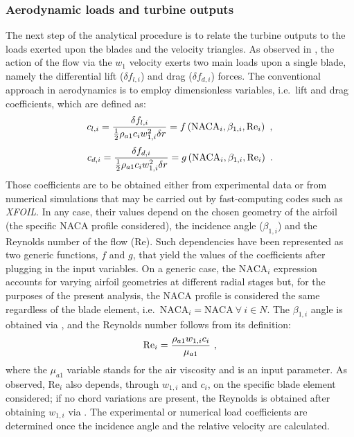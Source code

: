 \subsubsection*{Aerodynamic loads and turbine outputs}{\label{subsubsec:aerodynamic_loads_turbine_outputs}}
The next step of the analytical procedure is to relate the turbine outputs to the loads exerted upon the blades and the velocity triangles. As observed in , the action of the flow via the $w_{1}$ velocity exerts two main loads upon a single blade, namely the differential lift ($\delta{f_{l,i}}$) and drag ($\delta{f_{d,i}}$) forces. The conventional approach in aerodynamics is to employ dimensionless variables, i.e.\ lift and drag coefficients, which are defined as:
\begin{equation}{\label{eq:cl_definition}}
	c_{l,i} = \frac{\delta{f_{l,i}}}{\frac{1}{2}\rho_{a1}c_{i}w_{1,i}^{2}\delta{r}}=f\left(\text{NACA}_{i}, \beta_{1,i}, \text{Re}_{i}\right) \ ,
\end{equation}
\begin{equation}{\label{eq:cd_definition}}
	c_{d,i} = \frac{\delta{f_{d,i}}}{\frac{1}{2}\rho_{a1}c_{i}w_{1,i}^{2}\delta{r}}=g\left(\text{NACA}_{i}, \beta_{1,i}, \text{Re}_{i}\right) \ .
\end{equation}
Those coefficients are to be obtained either from experimental data or from numerical simulations that may be carried out by fast-computing codes such as \emph{XFOIL}. In any case, their values depend on the chosen geometry of the airfoil (the specific NACA profile considered), the incidence angle ($\beta_{1,i}$) and the Reynolds number of the flow (Re). Such dependencies have been represented as two generic functions, $f$ and $g$, that yield the values of the coefficients after plugging in the input variables. On a generic case, the $\text{NACA}_{i}$ expression accounts for varying airfoil geometries at different radial stages but, for the purposes of the present analysis, the NACA profile is considered the same regardless of the blade element, i.e.\ $\text{NACA}_{i}=\text{NACA} \ \forall \ i\in{N}$. The $\beta_{1,i}$ angle is obtained via , and the Reynolds number follows from its definition:
\begin{equation}{\label{eq:Reynolds_definition}}
	\text{Re}_{i} = \frac{\rho_{a1}w_{1,i}c_{i}}{\mu_{a1}} \ ,
\end{equation}
where the $\mu_{a1}$ variable stands for the air viscosity and is an input parameter. As observed, $\text{Re}_{i}$ also depends, through $w_{1,i}$ and $c_{i}$, on the specific blade element considered; if no chord variations are present, the Reynolds is obtained after obtaining $w_{1,i}$ via . The experimental or numerical load coefficients are determined once the incidence angle and the relative velocity are calculated.\\
